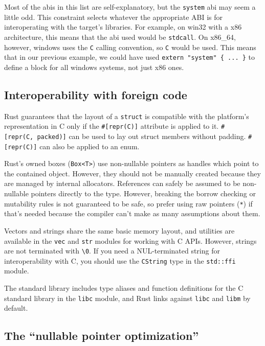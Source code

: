 \documentclass[a4paper,]{book}
\begin{document}
Most of the abis in this list are self-explanatory, but the
\texttt{system} abi may seem a little odd. This constraint selects
whatever the appropriate ABI is for interoperating with the target's
libraries. For example, on win32 with a x86 architecture, this means
that the abi used would be \texttt{stdcall}. On x86\_64, however,
windows uses the \texttt{C} calling convention, so \texttt{C} would be
used. This means that in our previous example, we could have used
\texttt{extern\ "system"\ \{\ ...\ \}} to define a block for all windows
systems, not just x86 ones.

\subsection{Interoperability with foreign
code}\label{interoperability-with-foreign-code}

Rust guarantees that the layout of a \texttt{struct} is compatible with
the platform's representation in C only if the \texttt{\#{[}repr(C){]}}
attribute is applied to it. \texttt{\#{[}repr(C,\ packed){]}} can be
used to lay out struct members without padding. \texttt{\#{[}repr(C){]}}
can also be applied to an enum.

Rust's owned boxes (\texttt{Box\textless{}T\textgreater{}}) use
non-nullable pointers as handles which point to the contained object.
However, they should not be manually created because they are managed by
internal allocators. References can safely be assumed to be non-nullable
pointers directly to the type. However, breaking the borrow checking or
mutability rules is not guaranteed to be safe, so prefer using raw
pointers (\texttt{*}) if that's needed because the compiler can't make
as many assumptions about them.

Vectors and strings share the same basic memory layout, and utilities
are available in the \texttt{vec} and \texttt{str} modules for working
with C APIs. However, strings are not terminated with
\texttt{\textbackslash{}0}. If you need a NUL-terminated string for
interoperability with C, you should use the \texttt{CString} type in the
\texttt{std::ffi} module.

The standard library includes type aliases and function definitions for
the C standard library in the \texttt{libc} module, and Rust links
against \texttt{libc} and \texttt{libm} by default.

\subsection{\texorpdfstring{The ``nullable pointer
optimization''}{The nullable pointer optimization}}\label{the-nullable-pointer-optimization}
\end{document}
